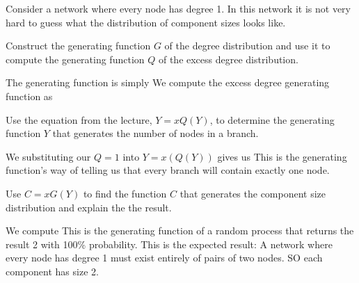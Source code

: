 
Consider a network where every node has degree 1. In this network it is not very hard to guess what the distribution of component sizes looks like. 

\subquestion Construct the generating function $G$ of the degree distribution and use it to compute the generating function $Q$ of the excess degree distribution. 

\solution
The generating function is simply 
We compute the excess degree generating function as

\subquestion Use the equation from the lecture, $Y=xQ(Y)$, to determine the generating function $Y$ that generates the number of nodes in a branch. 

\solution
We substituting our $Q=1$ into $Y=x(Q(Y))$ gives us 
This is the generating function's way of telling us that every branch will contain exactly one node. 

\subquestion Use $C=xG(Y)$ to find the function $C$ that generates the component size distribution and explain the the result.

\solution
We compute 
This is the generating function of a random process that returns the result 2 with 100\% probability. This is the expected result: A network where every node has degree 1 must exist entirely of pairs of two nodes. SO each component has size 2. 